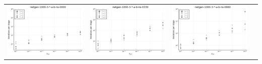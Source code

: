 \documentclass{article}
\begin{document}
\begin{landscape}
\begin{center}
\begin{longtable}{| c | c | c | c |}
                \hline
\includegraphics[height=0.22\textheight]{itepst_fixlim_netgen-1000-3-_-a-b-ns-0000.png} &
\includegraphics[height=0.22\textheight]{itepst_fixlim_netgen-1000-3-_-a-b-ns-0330.png} &
\includegraphics[height=0.22\textheight]{itepst_fixlim_netgen-1000-3-_-a-b-ns-0660.png} &

\end{longtable}
\end{center}
\end{landscape}
\end{document}
